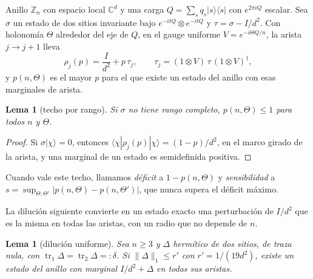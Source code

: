 \documentclass[11pt,a4paper]{article}
\newtheorem{lema}[teorema]{Lema}
\theoremstyle{remark}
\newcommand{\tr}{\operatorname{tr}}
\newcommand{\ket}[1]{|#1\rangle}
\newcommand{\bra}[1]{\langle #1|}
\begin{document}
Anillo $\mathbb Z_n$ con espacio local $\mathbb C^d$ y una carga $Q=\sum_sq_s\ket s\bra s$ con
$e^{2\pi iQ}$ escalar. Sea $\sigma$ un estado de dos sitios invariante bajo
$e^{-itQ}\otimes e^{-itQ}$ y $\tau=\sigma-I/d^2$. Con holonomía $\Theta$ alrededor del eje de $Q$,
en el gauge uniforme $V=e^{-i\Theta Q/n}$, la arista $j\to j{+}1$ lleva
\[
  \rho_j(p)=\frac I{d^2}+p\,\tau_j,\qquad \tau_j=(1\otimes V)\,\tau\,(1\otimes V)^\dagger,
\]
y $p(n,\Theta)$ es el mayor $p$ para el que existe un estado del anillo con esas marginales de
arista.

\begin{lema}[techo por rango]\label{lem:techo}
Si $\sigma$ no tiene rango completo, $p(n,\Theta)\le1$ para todos $n$ y $\Theta$.
\end{lema}

\begin{proof}
Si $\sigma\ket\chi=0$, entonces $\bra\chi\rho_j(p)\ket\chi=(1-p)/d^2$, en el marco girado de la
arista, y una marginal de un estado es semidefinida positiva.
\end{proof}

Cuando vale este techo, llamamos \emph{déficit} a $1-p(n,\Theta)$ y \emph{sensibilidad} a
$s=\sup_{\Theta,\Theta'}|p(n,\Theta)-p(n,\Theta')|$, que nunca supera el déficit máximo.

La dilución siguiente convierte en un estado exacto una perturbación de $I/d^2$ que es la misma en
todas las aristas, con un radio que no depende de $n$.

\begin{lema}[dilución uniforme]\label{lem:dilucionti}
Sea $n\ge3$ y $\Delta$ hermítico de dos sitios, de traza nula, con $\tr_1\Delta=\tr_2\Delta=:\delta$.
Si $\|\Delta\|_1\le r'$ con $r'=1/(19d^2)$, existe un estado del anillo con marginal
$I/d^2+\Delta$ en todas sus aristas.
\end{lema}
\end{document}
